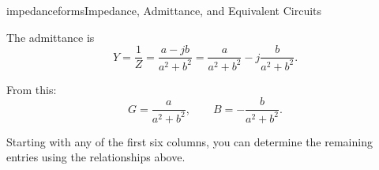\begin{mainquestion}{impedanceforms}{Impedance, Admittance, and Equivalent Circuits}
\begin{answer}
\medskip

The admittance is
\[
Y = \frac{1}{Z}
= \frac{a - jb}{a^2 + b^2}
= \frac{a}{a^2 + b^2}
- j\frac{b}{a^2 + b^2}.
\]

From this:
\[
G = \frac{a}{a^2 + b^2}, \qquad
B = -\frac{b}{a^2 + b^2}.
\]

\medskip

Starting with any of the first six columns, you can determine the remaining
entries using the relationships above.
\end{answer}

\end{mainquestion}
